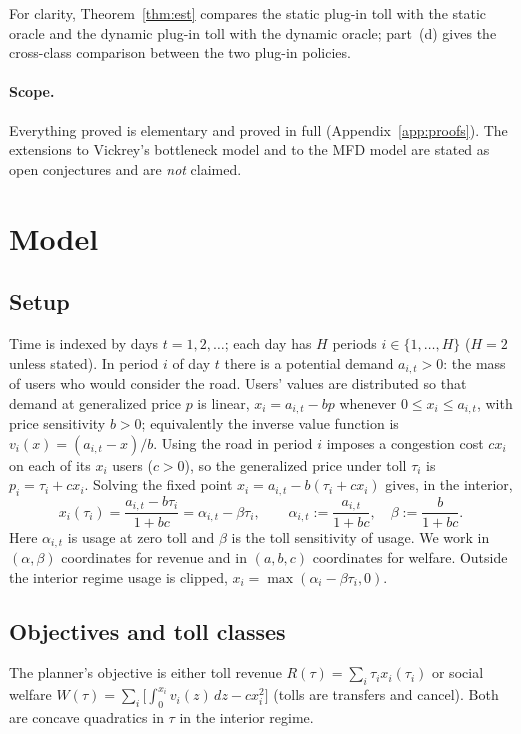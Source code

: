 \documentclass[11pt]{article}
\theoremstyle{definition}
\theoremstyle{remark}
\begin{document}
For clarity, Theorem~\ref{thm:est} compares the static plug-in toll with the static oracle and the dynamic plug-in toll with the dynamic oracle; part~(d) gives the cross-class comparison between the two plug-in policies.

\paragraph{Scope.} Everything proved is elementary and proved in full (Appendix~\ref{app:proofs}). The extensions to Vickrey's bottleneck model and to the MFD model are stated as open conjectures and are \emph{not} claimed.

\section{Model}\label{sec:model}
\subsection{Setup}
Time is indexed by days $t=1,2,\dots$; each day has $H$ periods $i\in\{1,\dots,H\}$ ($H=2$ unless stated). In period $i$ of day $t$ there is a potential demand $a_{i,t}>0$: the mass of users who would consider the road. Users' values are distributed so that demand at generalized price $p$ is linear,
$x_i=a_{i,t}-bp$ whenever $0\le x_i\le a_{i,t}$, with price sensitivity $b>0$; equivalently the inverse value function is $v_i(x)=(a_{i,t}-x)/b$. Using the road in period $i$ imposes a congestion cost $cx_i$ on each of its $x_i$ users ($c>0$), so the generalized price under toll $\tau_i$ is $p_i=\tau_i+cx_i$. Solving the fixed point $x_i=a_{i,t}-b(\tau_i+cx_i)$ gives, in the interior,
\begin{equation}\label{eq:usage}
x_i(\tau_i)=\frac{a_{i,t}-b\tau_i}{1+bc}=\alpha_{i,t}-\beta\tau_i,\qquad \alpha_{i,t}:=\frac{a_{i,t}}{1+bc},\quad\beta:=\frac{b}{1+bc}.
\end{equation}
Here $\alpha_{i,t}$ is usage at zero toll and $\beta$ is the toll sensitivity of usage. We work in $(\alpha,\beta)$ coordinates for revenue and in $(a,b,c)$ coordinates for welfare. Outside the interior regime usage is clipped, $x_i=\max(\alpha_i-\beta\tau_i,0)$.

\subsection{Objectives and toll classes}
The planner's objective is either toll revenue $R(\tau)=\sum_i\tau_ix_i(\tau_i)$ or social welfare $W(\tau)=\sum_i\big[\int_0^{x_i}v_i(z)\,dz-cx_i^2\big]$ (tolls are transfers and cancel). Both are concave quadratics in $\tau$ in the interior regime.
\end{document}

